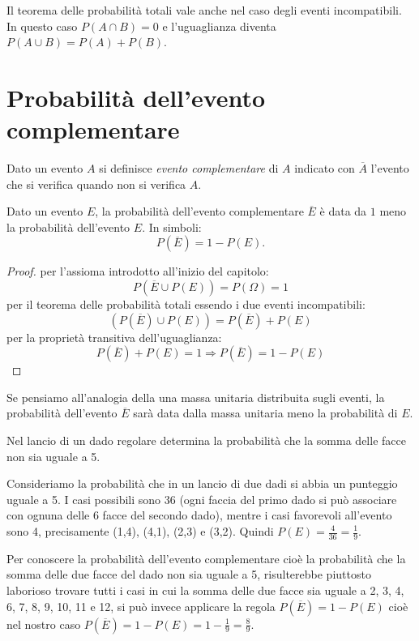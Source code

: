 \osservazione Il teorema delle probabilità totali vale anche nel caso degli 
eventi incompatibili. In questo caso $P(A\cap B)=0$ e l'uguaglianza diventa 
$P(A\cup B)=P(A)+P(B)$.


\section{Probabilità dell'evento complementare}
\label{sec:09_complementare}

Dato un evento $A$ si definisce \emph{evento complementare} di $A$ indicato 
con 
$\overline A$ l'evento che si verifica quando non si verifica $A$.
\begin{teorema}
Dato un evento $E$, la probabilità dell'evento complementare $\overline E$ 
è 
data da $1$ meno la probabilità dell'evento $E$. In simboli: 
\[ P(\overline E)=1-P(E). \]
\end{teorema}
\begin{proof} per l'assioma introdotto all'inizio del capitolo: 
\[P(\overline E\cup P(E))=P(\Omega )=1\]
per il teorema delle probabilità totali essendo i due eventi incompatibili: 
\[(P(\overline E)\cup P(E))=P(\overline E)+P(E)\]
per la proprietà transitiva dell'uguaglianza: 
\[P(\overline E)+P(E)=1 \Rightarrow P(\overline E)=1-P(E)\]
\end{proof}
Se pensiamo all'analogia della una massa unitaria distribuita sugli eventi, 
la probabilità dell'evento $\overline E$ sarà data dalla massa unitaria 
meno la probabilità di $E$.

\begin{esempio}
Nel lancio di un dado regolare determina la probabilità che la somma delle 
facce 
non sia uguale a 5.

Consideriamo la probabilità che in un lancio di due dadi si abbia un 
punteggio 
uguale a 5. I casi possibili sono 36 (ogni faccia del primo dado si può 
associare con ognuna delle 6 facce del secondo dado), mentre i casi 
favorevoli 
all'evento sono 4, precisamente (1,4), (4,1), (2,3) e (3,2). 
Quindi $P(E)=\frac{4}{36}=\frac{1}{9}$.

Per conoscere la probabilità dell'evento complementare cioè la probabilità 
che la somma delle due facce del dado non sia uguale a 5, risulterebbe 
piuttosto laborioso trovare tutti i casi in cui la somma delle due facce sia 
uguale a 2, 3, 4, 6, 7, 8, 9, 10, 11 e 12, si può invece applicare la 
regola 
$P(\overline E)=1-P(E)$ 
cioè nel nostro caso $P(\overline E)=1-P(E)=1-\frac{1}{9}=\frac{8}{9}$.
\end{esempio}

